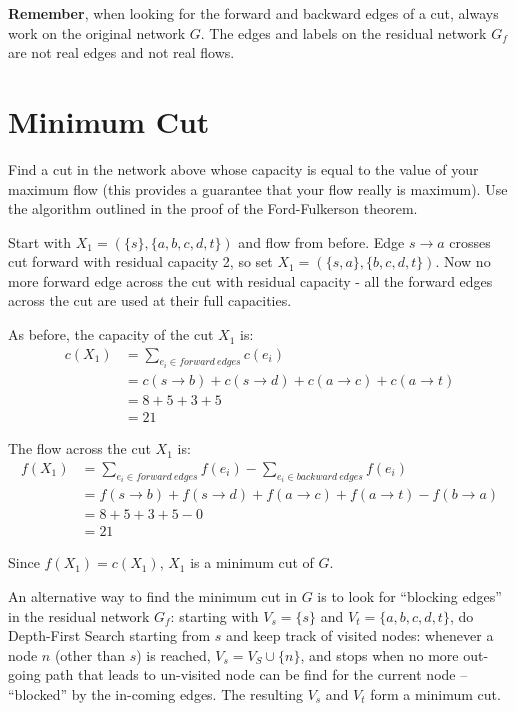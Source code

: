 \documentclass{article}
\begin{document}
{\bf Remember}, 
when looking for the forward and backward edges of a cut, always work on the
original network $G$. 
The edges and labels on the residual network $G_f$ 
are not real edges and not real flows.

\section{Minimum Cut}
Find a cut in the network above whose capacity is equal to the value
of your maximum flow (this provides a guarantee that your flow really
is maximum). Use the algorithm outlined in the proof of the
Ford-Fulkerson theorem.

Start with $X_1 = (\{s\}, \{a,b,c,d,t\})$ and flow from before.
Edge $s \rightarrow a$ crosses cut forward with residual capacity 2, so set
$X_1 = (\{s,a\}, \{b,c,d,t\})$. Now no more forward edge across the cut 
with residual capacity - all the forward edges across the cut are used at
their full capacities.

As before, the capacity of the cut $X_1$ is:
\begin{equation}
	\begin{split}
		c(X_1) &= \sum_{e_i \in forward~edges} c(e_i)\\
		&=c(s \rightarrow b) + c(s \rightarrow d) + 
		c(a\rightarrow c) + c(a \rightarrow t)\\
		&= 8 + 5 + 3 + 5 \\
		&= 21
	\end{split}
\end{equation}

The flow across the cut $X_1$ is:
\begin{equation}
	\begin{split}
		f(X_1) &= \sum_{e_i \in forward~edges} f(e_i)
		- \sum_{e_i \in backward~edges} f(e_i)\\
		&= f(s \rightarrow b) + f(s \rightarrow d) + 
		f(a \rightarrow c) + f(a\rightarrow t) - f(b \rightarrow a)\\
		&=8 + 5 + 3 + 5 -0\\
		&= 21
	\end{split}
\end{equation}

Since $f(X_1) = c(X_1)$, $X_1$ is a minimum cut of $G$.

An alternative way to find the minimum cut in $G$ is to look for ``blocking edges'' in
the residual network $G_f$: starting with 
$V_s = \{s\}$ and $V_t = \{a, b, c, d, t\}$,
do Depth-First Search starting from $s$ and keep track of visited nodes: 
whenever a node $n$ (other than $s$) is reached, $V_s = V_S \cup \{n\}$,
and stops when no more out-going path that leads to un-visited node 
can be find for the current node -- ``blocked'' by the in-coming edges.
The resulting $V_s$ and $V_t$ form a minimum cut.
\end{document}
